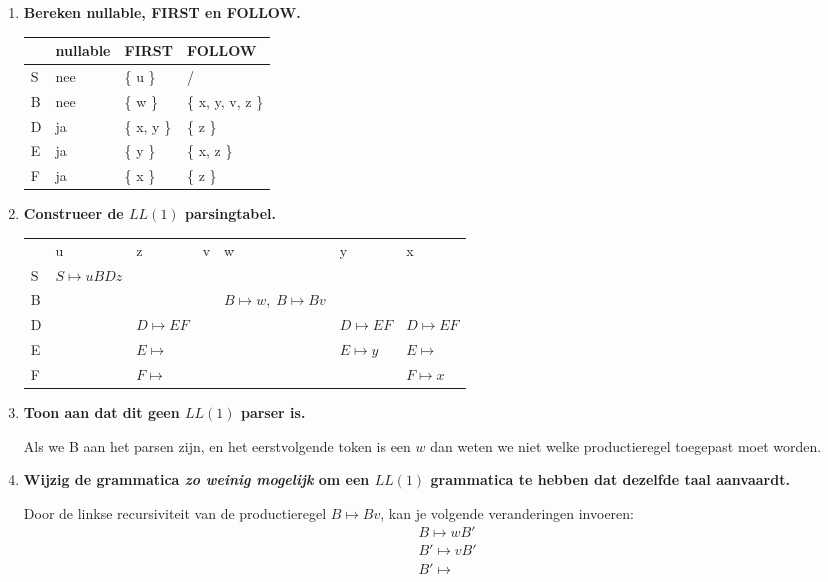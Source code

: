 \begin{enumerate}
	\item \textbf{Bereken nullable, FIRST en FOLLOW.}
	\begin{table}[h]
		\centering
		\begin{tabular}{| l | l | l | l |}
			\hline
			& nullable & FIRST & FOLLOW \\
			\hline
			S & nee & \{ u \}    & /	 			\\
			B & nee & \{ w \}    & \{ x, y, v, z \}	\\
			D & ja  & \{ x, y \} & \{ z \}			\\
			E & ja  & \{ y \}    & \{ x, z \}		\\
			F & ja  & \{ x \}    & \{ z \}			\\
			\hline
		\end{tabular}
	\end{table}

	\item \textbf{Construeer de $LL(1)$ parsingtabel.}
	\begin{table}[h]
		\centering
		\begin{tabular}{| l | l | l | l | l | l | l |}
			\hline
			   & u 					& z & v & w & y & x \\
			 S & $S \mapsto uBDz$  	&   &   &   &   &   \\
			 B &   					&   &   & $B \mapsto w, \; B \mapsto Bv$  &   &   \\
			 D &  					& $D \mapsto EF$  &   &   & $D \mapsto EF$  & $D \mapsto EF$   \\
			 E &   					& $E \mapsto $  &   &   & $E \mapsto y$  &  $E \mapsto $ \\
			 F &   					& $F \mapsto $  &   &   &   &  $F \mapsto x$ \\
			\hline
		\end{tabular}
	\end{table}

	\item \textbf{Toon aan dat dit geen $LL(1)$ parser is.}
	
	Als we B aan het parsen zijn, en het eerstvolgende token is een $w$ dan weten we niet welke productieregel toegepast moet worden.
	
	\item \textbf{Wijzig de grammatica \emph{zo weinig mogelijk} om een $LL(1)$ grammatica te hebben dat dezelfde taal aanvaardt.}
	
	Door de linkse recursiviteit van de productieregel $B \mapsto Bv$, kan je volgende veranderingen invoeren:
	\begin{equation*}
		\begin{split}
		& B \mapsto wB' \\
		& B' \mapsto vB' \\
		& B' \mapsto 
		\end{split}
	\end{equation*}
\end{enumerate}

